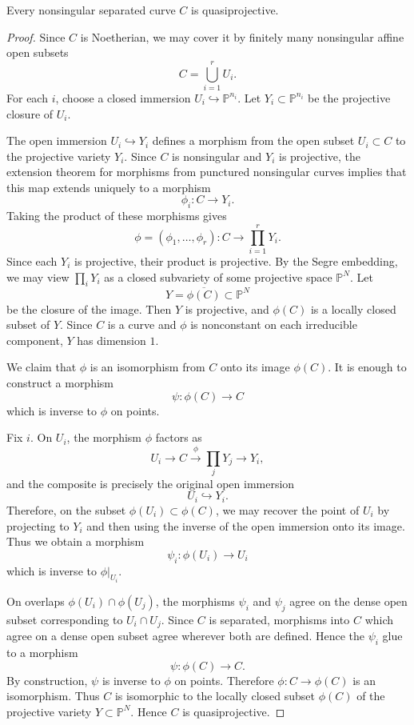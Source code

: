 \documentclass[12pt]{article}
\begin{document}
\begin{theorem}
    Every nonsingular separated curve $C$ is quasiprojective.
\end{theorem}

\begin{proof}
    Since $C$ is Noetherian, we may cover it by finitely many nonsingular affine open subsets
    \[
        C=\bigcup_{i=1}^r U_i.
    \]
    For each $i$, choose a closed immersion $U_i\hookrightarrow \mathbb P^{n_i}.$ Let $Y_i\subset \mathbb P^{n_i}$ be the projective closure of $U_i$.

    The open immersion $U_i\hookrightarrow Y_i$ defines a morphism from the open subset $U_i\subset C$ to the projective variety $Y_i$. Since $C$ is nonsingular and $Y_i$ is projective, the extension theorem for morphisms from punctured nonsingular curves implies that this map extends uniquely to a morphism
    \[
        \phi_i:C\to Y_i.
    \]
    Taking the product of these morphisms gives
    \[
        \phi=(\phi_1,\dots,\phi_r):C\to \prod_{i=1}^r Y_i.
    \]
    Since each $Y_i$ is projective, their product is projective. By the Segre embedding, we may view $\prod_i Y_i$ as a closed subvariety of some projective space $\mathbb P^N$. Let
    \[
        Y=\overline{\phi(C)}\subset \mathbb P^N
    \]
    be the closure of the image. Then $Y$ is projective, and $\phi(C)$ is a locally closed subset of $Y$. Since $C$ is a curve and $\phi$ is nonconstant on each irreducible component, $Y$ has dimension $1$.

    We claim that $\phi$ is an isomorphism from $C$ onto its image $\phi(C)$. It is enough to construct a morphism
    \[
        \psi:\phi(C)\to C
    \]
    which is inverse to $\phi$ on points.

    Fix $i$. On $U_i$, the morphism $\phi$ factors as
    \[
        U_i \longrightarrow C \xrightarrow{\phi} \prod_j Y_j \longrightarrow Y_i,
    \]
    and the composite is precisely the original open immersion
    \[
        U_i\hookrightarrow Y_i.
    \]
    Therefore, on the subset $\phi(U_i)\subset \phi(C)$, we may recover the point of $U_i$ by projecting to $Y_i$ and then using the inverse of the open immersion onto its image. Thus we obtain a morphism
    \[
        \psi_i:\phi(U_i)\to U_i
    \]
    which is inverse to $\phi|_{U_i}$.

    On overlaps $\phi(U_i)\cap \phi(U_j)$, the morphisms $\psi_i$ and $\psi_j$ agree on the dense open subset corresponding to $U_i\cap U_j$. Since $C$ is separated, morphisms into $C$ which agree on a dense open subset agree wherever both are defined. Hence the $\psi_i$ glue to a morphism
    \[
        \psi:\phi(C)\to C.
    \]
    By construction, $\psi$ is inverse to $\phi$ on points. Therefore $\phi:C\to \phi(C)$
    is an isomorphism. Thus $C$ is isomorphic to the locally closed subset $\phi(C)$ of the projective variety $Y\subset \mathbb P^N$. Hence $C$ is quasiprojective.
\end{proof}
\end{document}
